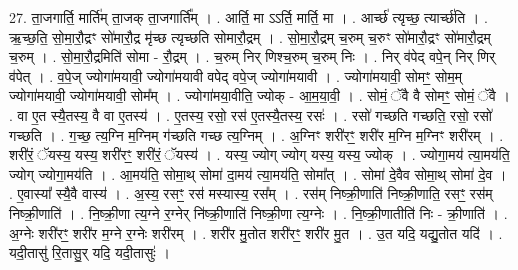 \documentclass[17pt]{extarticle}
\begin{document}
27. ता॒जगार्ति॒ मार्ति॑म् ता॒जक् ता॒जगार्ति᳚म् । . आर्ति॒ मा ऽऽर्ति॒ मार्ति॒ मा । . आर्च्छ॑ त्यृच्छ॒ त्यार्च्छ॑ति । . ऋ॒च्छ॒ति॒ सो॒मा॒रौ॒द्रꣳ सो॑मारौ॒द्र मृ॑च्छ त्यृच्छति सोमारौ॒द्रम् । . सो॒मा॒रौ॒द्रम् च॒रुम् च॒रुꣳ सो॑मारौ॒द्रꣳ सो॑मारौ॒द्रम् च॒रुम् । . सो॒मा॒रौ॒द्रमिति॑ सोमा - रौ॒द्रम् । . च॒रुम् निर् णिश्च॒रुम् च॒रुम् निः । . निर् व॑पेद् वपे॒न् निर् णिर् व॑पेत् । . व॒पे॒ज् ज्योगा॑मयावी॒ ज्योगा॑मयावी वपेद् वपे॒ज् ज्योगा॑मयावी । . ज्योगा॑मयावी॒ सोमꣳ॒॒ सोम॒म् ज्योगा॑मयावी॒ ज्योगा॑मयावी॒ सोम᳚म् । . ज्योगा॑मया॒वीति॒ ज्योक् - आ॒म॒या॒वी॒ । . सोमं॒ ॅवै वै सोमꣳ॒॒ सोमं॒ ॅवै । . वा ए॒त स्यै॒तस्य॒ वै वा ए॒तस्य॑ । . ए॒तस्य॒ रसो॒ रस॑ ए॒तस्यै॒तस्य॒ रसः॑ । . रसो॑ गच्छति गच्छति॒ रसो॒ रसो॑ गच्छति । . ग॒च्छ॒ त्य॒ग्नि म॒ग्निम् ग॑च्छति गच्छ त्य॒ग्निम् । . अ॒ग्निꣳ शरी॑रꣳ॒॒ शरी॑र म॒ग्नि म॒ग्निꣳ शरी॑रम् । . शरी॑रं॒ ॅयस्य॒ यस्य॒ शरी॑रꣳ॒॒ शरी॑रं॒ ॅयस्य॑ । . यस्य॒ ज्योग् ज्योग् यस्य॒ यस्य॒ ज्योक् । . ज्योगा॒मय॑ त्या॒मय॑ति॒ ज्योग् ज्योगा॒मय॑ति । . आ॒मय॑ति॒ सोमा॒थ् सोमा॑ दा॒मय॑ त्या॒मय॑ति॒ सोमा᳚त् । . सोमा॑ दे॒वैव सोमा॒थ् सोमा॑ दे॒व । . ए॒वास्या᳚ स्यै॒वै वास्य॑ । . अ॒स्य॒ रसꣳ॒॒ रस॑ मस्यास्य॒ रस᳚म् । . रस॑म् निष्क्री॒णाति॑ निष्क्री॒णाति॒ रसꣳ॒॒ रस॑म् निष्क्री॒णाति॑ । . नि॒ष्क्री॒णा त्य॒ग्ने र॒ग्नेर् नि॑ष्क्री॒णाति॑ निष्क्री॒णा त्य॒ग्नेः । . नि॒ष्क्री॒णातीति॑ निः - क्री॒णाति॑ । . अ॒ग्नेः शरी॑रꣳ॒॒ शरी॑र म॒ग्ने र॒ग्नेः शरी॑रम् । . शरी॑र मु॒तोत शरी॑रꣳ॒॒ शरी॑र मु॒त । . उ॒त यदि॒ यद्यु॒तोत यदि॑ । . यदी॒तासु॑ रि॒तासु॒र् यदि॒ यदी॒तासुः॑ । \newline
\end{document}
